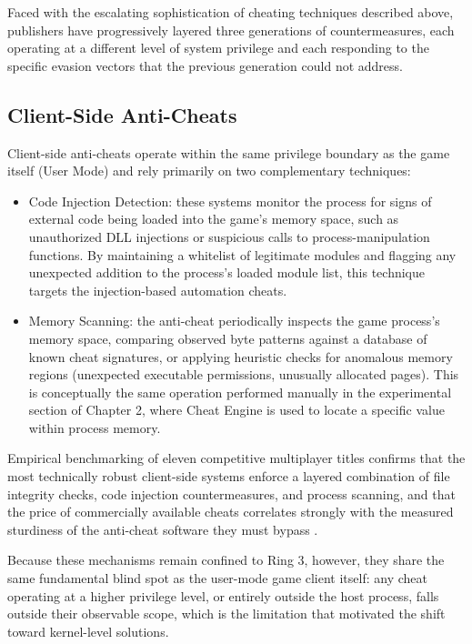 Faced with the escalating sophistication of cheating techniques described above, publishers have progressively layered three generations of countermeasures, each operating at a different level of system privilege and each responding to the specific evasion vectors that the previous generation could not address.

\subsection{Client-Side Anti-Cheats}
\label{sec:one:two:one}

Client-side anti-cheats operate within the same privilege boundary as the game itself (User Mode) and rely primarily on two complementary techniques:

\begin{itemize}
    \item Code Injection Detection: these systems monitor the process for signs of external code being loaded into the game's memory space, such as unauthorized DLL injections or suspicious calls to process-manipulation functions. By maintaining a whitelist of legitimate modules and flagging any unexpected addition to the process's loaded module list, this technique targets the injection-based automation cheats.
    \item Memory Scanning: the anti-cheat periodically inspects the game process's memory space, comparing observed byte patterns against a database of known cheat signatures, or applying heuristic checks for anomalous memory regions (unexpected executable permissions, unusually allocated pages). This is conceptually the same operation performed manually in the experimental section of Chapter 2, where Cheat Engine is used to locate a specific value within process memory.
\end{itemize}

Empirical benchmarking of eleven competitive multiplayer titles confirms that the most technically robust client-side systems enforce a layered combination of file integrity checks, code injection countermeasures, and process scanning, and that the price of commercially available cheats correlates strongly with the measured sturdiness of the anti-cheat software they must bypass \cite{Collins2024}.

Because these mechanisms remain confined to Ring 3, however, they share the same fundamental blind spot as the user-mode game client itself: any cheat operating at a higher privilege level, or entirely outside the host process, falls outside their observable scope, which is the limitation that motivated the shift toward kernel-level solutions.

